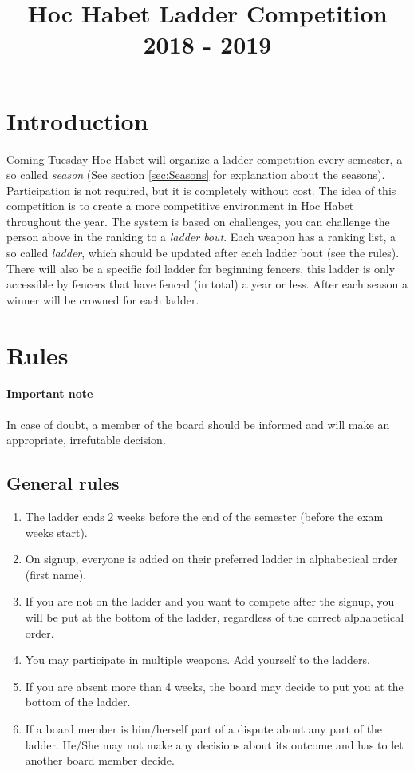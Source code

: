 \documentclass{article}
\title{Hoc Habet Ladder Competition \\ 2018 - 2019}
\author{}
\date{}
\begin{document}
\maketitle
\section{Introduction}
Coming Tuesday Hoc Habet will organize a ladder competition every semester, a so called \emph{season} (See section \ref{sec:Seasons} for explanation about the seasons). Participation is not required, but it is completely without cost. The idea of this competition is to create a more competitive environment in Hoc Habet throughout the year. The system is based on challenges, you can challenge the person above in the ranking to a \emph{ladder bout}. Each weapon has a ranking list, a so called \emph{ladder}, which should be updated after each ladder bout (see the rules). There will also be a specific foil ladder for beginning fencers, this ladder is only accessible by fencers that have fenced (in total) a year or less. After each season a winner will be crowned for each ladder.

\section{Rules}
\paragraph{Important note} In case of doubt, a member of the board should be informed and will make an appropriate, irrefutable decision. 
\subsection{General rules}
\begin{enumerate}
    \item The ladder ends 2 weeks before the end of the semester (before the exam weeks start).
    \item On signup, everyone is added on their preferred ladder in alphabetical order (first name). 
    \item If you are not on the ladder and you want to compete after the signup, you will be put at the bottom of the ladder, regardless of the correct alphabetical order.
    \item You may participate in multiple weapons. Add yourself to the ladders.
    \item If you are absent more than 4 weeks, the board may decide to put you at the bottom of the ladder.
    \item If a board member is him/herself part of a dispute about any part of the ladder. He/She may not make any decisions about its outcome and has to let another board member decide.
\end{enumerate}
\end{document}
